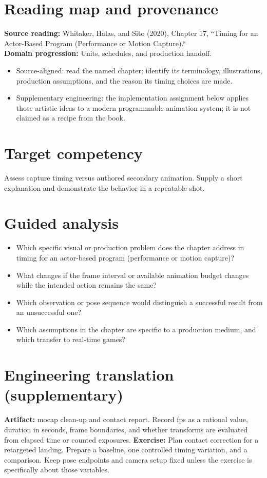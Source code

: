 \documentclass[10pt,letterpaper]{article}
\begin{document}
\makedoctitle
\makedocsummary

\section{Reading map and provenance}
\textbf{Source reading:} Whitaker, Halas, and Sito (2020), Chapter 17, ``Timing for an Actor-Based Program (Performance or Motion Capture).``\\
\textbf{Domain progression:} Units, schedules, and production handoff.
\begin{itemize}
\item Source-aligned: read the named chapter; identify its terminology, illustrations, production assumptions, and the reason its timing choices are made.
\item Supplementary engineering: the implementation assignment below applies those artistic ideas to a modern programmable animation system; it is not claimed as a recipe from the book.
\end{itemize}
\section{Target competency}
Assess capture timing versus authored secondary animation. Supply a short explanation and demonstrate the behavior in a repeatable shot.
\section{Guided analysis}
\begin{itemize}
\item Which specific visual or production problem does the chapter address in timing for an actor-based program (performance or motion capture)?
\item What changes if the frame interval or available animation budget changes while the intended action remains the same?
\item Which observation or pose sequence would distinguish a successful result from an unsuccessful one?
\item Which assumptions in the chapter are specific to a production medium, and which transfer to real-time games?
\end{itemize}
\section{Engineering translation (supplementary)}
\textbf{Artifact:} mocap clean-up and contact report. Record fps as a rational value, duration in seconds, frame boundaries, and whether transforms are evaluated from elapsed time or counted exposures.
\textbf{Exercise:} Plan contact correction for a retargeted landing. Prepare a baseline, one controlled timing variation, and a comparison. Keep pose endpoints and camera setup fixed unless the exercise is specifically about those variables.
\end{document}
